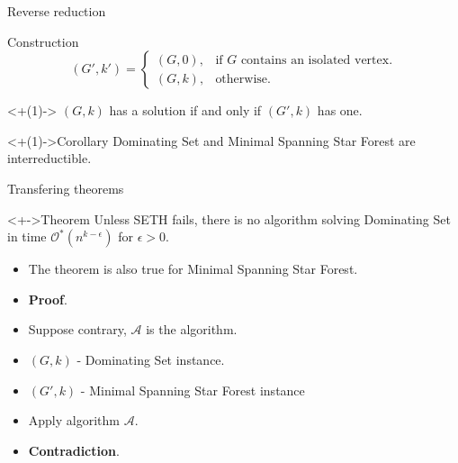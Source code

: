 \documentclass{beamer}
\begin{document}
\begin{frame}[t]{Reverse reduction}
	\begin{block}{Construction}	
		\begin{equation*}
		(G',k') =
		\begin{cases}
			(G,0), & \text{if } G \text{ contains an isolated vertex}. \\
			(G,k), & \text{otherwise.}
		\end{cases}
		\end{equation*}
	\end{block}
		
	\begin{Lemma}<+(1)->
		$(G,k)$ has a solution if and only if $(G',k)$ has one.
	\end{Lemma}	

	\vfill

	\begin{block}<+(1)->{Corollary}
		Dominating Set and Minimal Spanning Star Forest are interreductible.
	\end{block}

\end{frame}

\begin{frame}[t]{Transfering theorems}

	\begin{block}<+->{Theorem}
		Unless SETH fails, there is no algorithm solving Dominating Set in time $\mathcal{O}^*(n^{k-\epsilon})$ for $\epsilon > 0$.
	\end{block}
	\begin{itemize}[<+->]
		\item[] The theorem is also true for Minimal Spanning Star Forest.
		\bigskip
		\item[] \textbf{Proof}.
		\item[] Suppose contrary, $\mathcal{A}$ is the algorithm.
		\item[] $(G,k)$ - Dominating Set instance.
		\item[] $(G',k)$ - Minimal Spanning Star Forest instance
		\item[] Apply algorithm $\mathcal{A}$. 
		\item[] \textbf{Contradiction}.
		
	\end{itemize}
\end{frame}
\end{document}
